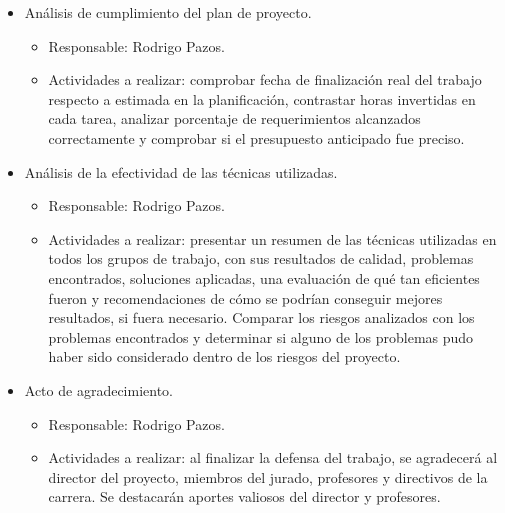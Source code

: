 \documentclass[
11pt, %
]{charter}
\begin{document}
\begin{itemize}
\item Análisis de cumplimiento del plan de proyecto.
\begin{itemize}
\item Responsable: Rodrigo Pazos.
\item Actividades a realizar: comprobar fecha de finalización real del trabajo respecto
a estimada en la planificación, contrastar horas invertidas en cada tarea, analizar
porcentaje de requerimientos alcanzados correctamente y comprobar si el presupuesto
anticipado fue preciso.
\end{itemize}
\item Análisis de la efectividad de las técnicas utilizadas.
\begin{itemize}
\item Responsable: Rodrigo Pazos.
\item Actividades a realizar: presentar un resumen de las técnicas utilizadas en todos los grupos de trabajo, con sus resultados de calidad, problemas encontrados, soluciones aplicadas, una evaluación de qué tan eficientes fueron y recomendaciones de cómo se podrían conseguir mejores resultados, si fuera necesario. Comparar los riesgos analizados con los problemas encontrados y determinar si alguno de los problemas pudo haber sido considerado dentro de los riesgos del proyecto.
\end{itemize}
\item Acto de agradecimiento.
\begin{itemize}
\item Responsable: Rodrigo Pazos.
\item Actividades a realizar: al finalizar la defensa del trabajo, se agradecerá al director
del proyecto, miembros del jurado, profesores y directivos de la carrera. Se destacarán aportes valiosos del director y profesores. 
\end{itemize}
\end{itemize}
\end{document}

